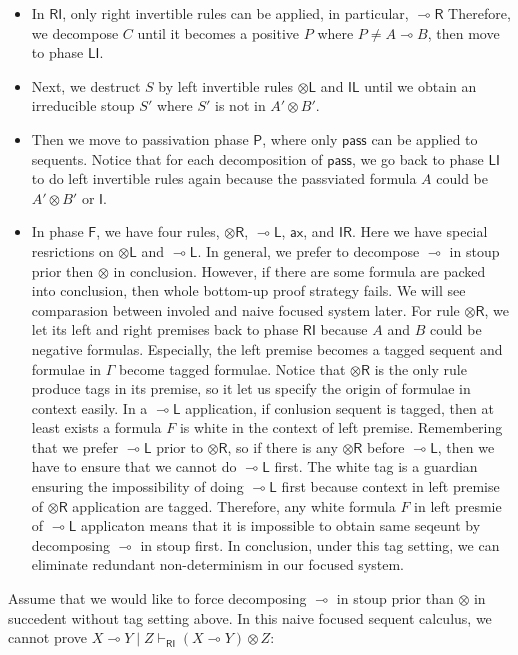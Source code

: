 \documentclass{article}
\newcommand{\tl}{\otimes \mathsf{L}}
\newcommand{\tr}{\otimes \mathsf{R}}
\newcommand{\lright}{\multimap \mathsf{R}}
\newcommand{\lleft}{\multimap \mathsf{L}}
\newcommand{\pass}{\mathsf{pass}}
\newcommand{\unitl}{\mathsf{IL}}
\newcommand{\unitr}{\mathsf{IR}}
\newcommand{\ax}{\mathsf{ax}}
\newcommand{\ot}{\otimes}
\newcommand{\lolli}{\multimap}
\newcommand{\I}{\mathsf{I}}
\newcommand{\RI}{\mathsf{RI}}
\newcommand{\LI}{\mathsf{LI}}
\newcommand{\Pass}{\mathsf{P}}
\newcommand{\F}{\mathsf{F}}
\begin{document}
\begin{itemize}
  \item In $\RI$, only right invertible rules can be applied, in particular, $\lright$
  Therefore, we decompose $C$ until it becomes a positive $P$ where $P \neq A \lolli B$, then move to phase $\LI$.
  \item Next, we destruct $S$ by left invertible rules $\tl$ and $\unitl$ until we obtain an irreducible stoup $S'$ where $S'$ is not in $A' \ot B'$.
  \item Then we move to passivation phase $\Pass$, where only $\pass$ can be applied to sequents.
  Notice that for each decomposition of $\pass$, we go back to phase $\LI$ to do left invertible rules again because the passviated formula $A$ could be $A' \ot B'$ or $\I$.
  \item In phase $\F$, we have four rules, $\tr$, $\lleft$, $\ax$, and $\unitr$.
  Here we have special resrictions on $\tl$ and $\lleft$.
  In general, we prefer to decompose $\lolli$ in stoup prior then $\ot$ in conclusion.
  However, if there are some formula are packed into conclusion, then whole bottom-up proof strategy fails.
  We will see comparasion between involed and naive focused system later.
  For rule $\tr$, we let its left and right premises back to phase $\RI$ because $A$ and $B$ could be negative formulas.
  Especially, the left premise becomes a tagged sequent and formulae in $\Gamma$ become tagged formulae.
  Notice that $\tr$ is the only rule produce tags in its premise, so it let us specify the origin of formulae in context easily.
  In a $\lleft$ application, if conlusion sequent is tagged, then at least exists a formula $F$ is white in the context of left premise.
  Remembering that we prefer $\lleft$ prior to $\tr$, so if there is any $\tr$ before $\lleft$, then we have to ensure that we cannot do $\lleft$ first.
  The white tag is a guardian ensuring the impossibility of doing $\lleft$ first because context in left premise of $\tr$ application are tagged.
  Therefore, any white formula $F$ in left presmie of $\lleft$ applicaton means that it is impossible to obtain same seqeunt by decomposing $\lolli$ in stoup first.
  In conclusion, under this tag setting, we can eliminate redundant non-determinism in our focused system.
\end{itemize}

Assume that we would like to force decomposing $\lolli$ in stoup prior than $\ot$ in succedent without tag setting above.
In this naive focused sequent calculus, we cannot prove $X \lolli Y \mid Z \vdash_{\RI} (X \lolli Y) \ot Z$:
\end{document}
